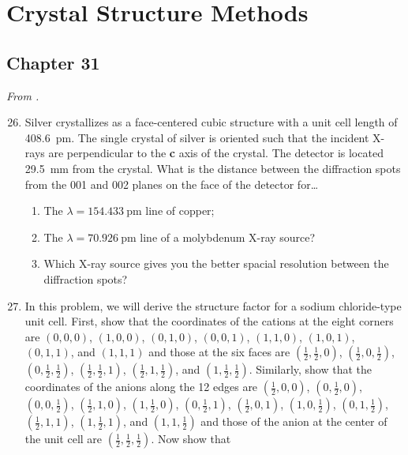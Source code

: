 \documentclass[../psets.tex]{subfiles}
\begin{document}
\section{Crystal Structure Methods}
\subsection*{Chapter 31}
\emph{From \textcite{bib:McQuarrieSimon}.}
\begin{enumerate}[label={\textbf{31-\arabic*.}},leftmargin=3.5em]
    \setcounter{enumi}{25}
    \item {}Silver crystallizes as a face-centered cubic structure with a unit cell length of \SI{408.6}{\pico\meter}. The single crystal of silver is oriented such that the incident X-rays are perpendicular to the \textbf{c} axis of the crystal. The detector is located \SI{29.5}{\milli\meter} from the crystal. What is the distance between the diffraction spots from the 001 and 002 planes on the face of the detector for\dots
    \begin{enumerate}
        \item The $\lambda=\SI{154.433}{\pico\meter}$ line of copper;
        \item The $\lambda=\SI{70.926}{\pico\meter}$ line of a molybdenum X-ray source?
        \item Which X-ray source gives you the better spacial resolution between the diffraction spots?
    \end{enumerate}
    \setcounter{enumi}{40}
    \item In this problem, we will derive the structure factor for a sodium chloride-type unit cell. First, show that the coordinates of the cations at the eight corners are $(0,0,0)$, $(1,0,0)$, $(0,1,0)$, $(0,0,1)$, $(1,1,0)$, $(1,0,1)$, $(0,1,1)$, and $(1,1,1)$ and those at the six faces are $(\frac{1}{2},\frac{1}{2},0)$, $(\frac{1}{2},0,\frac{1}{2})$, $(0,\frac{1}{2},\frac{1}{2})$, $(\frac{1}{2},\frac{1}{2},1)$, $(\frac{1}{2},1,\frac{1}{2})$, and $(1,\frac{1}{2},\frac{1}{2})$. Similarly, show that the coordinates of the anions along the 12 edges are $(\frac{1}{2},0,0)$, $(0,\frac{1}{2},0)$, $(0,0,\frac{1}{2})$, $(\frac{1}{2},1,0)$, $(1,\frac{1}{2},0)$, $(0,\frac{1}{2},1)$, $(\frac{1}{2},0,1)$, $(1,0,\frac{1}{2})$, $(0,1,\frac{1}{2})$, $(\frac{1}{2},1,1)$, $(1,\frac{1}{2},1)$, and $(1,1,\frac{1}{2})$ and those of the anion at the center of the unit cell are $(\frac{1}{2},\frac{1}{2},\frac{1}{2})$. Now show that
    \begin{align*}

\end{align*}
\end{enumerate}
\end{document}
